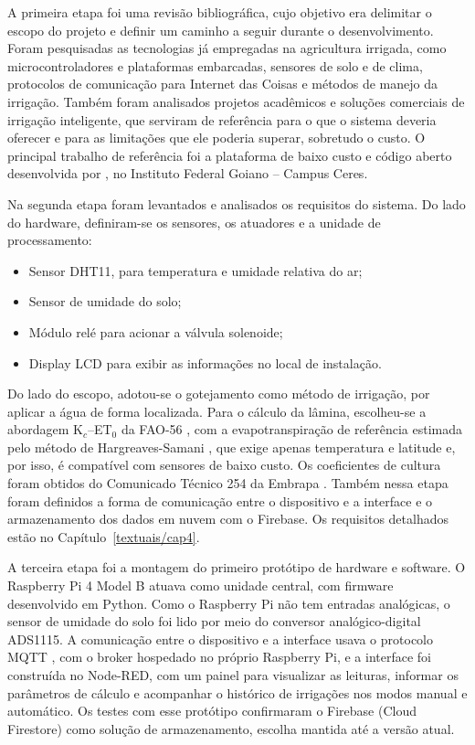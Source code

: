 A primeira etapa foi uma revisão bibliográfica, cujo objetivo era delimitar o escopo do projeto e definir um caminho a seguir durante o desenvolvimento. Foram pesquisadas as tecnologias já empregadas na agricultura irrigada, como microcontroladores e plataformas embarcadas, sensores de solo e de clima, protocolos de comunicação para Internet das Coisas e métodos de manejo da irrigação. Também foram analisados projetos acadêmicos e soluções comerciais de irrigação inteligente, que serviram de referência para o que o sistema deveria oferecer e para as limitações que ele poderia superar, sobretudo o custo. O principal trabalho de referência foi a plataforma de baixo custo e código aberto desenvolvida por , no Instituto Federal Goiano -- Campus Ceres.

Na segunda etapa foram levantados e analisados os requisitos do sistema. Do lado do hardware, definiram-se os sensores, os atuadores e a unidade de processamento: 

\begin{itemize} 
    \item Sensor DHT11, para temperatura e umidade relativa do ar; 
    \item Sensor de umidade do solo;
    \item Módulo relé para acionar a válvula solenoide; 
    \item Display LCD para exibir as informações no local de instalação. 
\end{itemize}

Do lado do escopo, adotou-se o gotejamento como método de irrigação, por aplicar a água de forma localizada. Para o cálculo da lâmina, escolheu-se a abordagem K$_c$--ET$_0$ da FAO-56 \cite{allen1998}, com a evapotranspiração de referência estimada pelo método de Hargreaves-Samani \cite{hargreaves1985}, que exige apenas temperatura e latitude e, por isso, é compatível com sensores de baixo custo. Os coeficientes de cultura foram obtidos do Comunicado Técnico 254 da Embrapa \cite{albuquerque2021planilha}. Também nessa etapa foram definidos a forma de comunicação entre o dispositivo e a interface e o armazenamento dos dados em nuvem com o Firebase. Os requisitos detalhados estão no Capítulo~\ref{textuais/cap4}. 
 
A terceira etapa foi a montagem do primeiro protótipo de hardware e software. O Raspberry Pi 4 Model B \cite{raspberrypi4} atuava como unidade central, com firmware desenvolvido em Python. Como o Raspberry Pi não tem entradas analógicas, o sensor de umidade do solo foi lido por meio do conversor analógico-digital ADS1115. A comunicação entre o dispositivo e a interface usava o protocolo MQTT \cite{mqtt5}, com o broker hospedado no próprio Raspberry Pi, e a interface foi construída no Node-RED, com um painel para visualizar as leituras, informar os parâmetros de cálculo e acompanhar o histórico de irrigações nos modos manual e automático. Os testes com esse protótipo confirmaram o Firebase (Cloud Firestore) como solução de armazenamento, escolha mantida até a versão atual.
 
